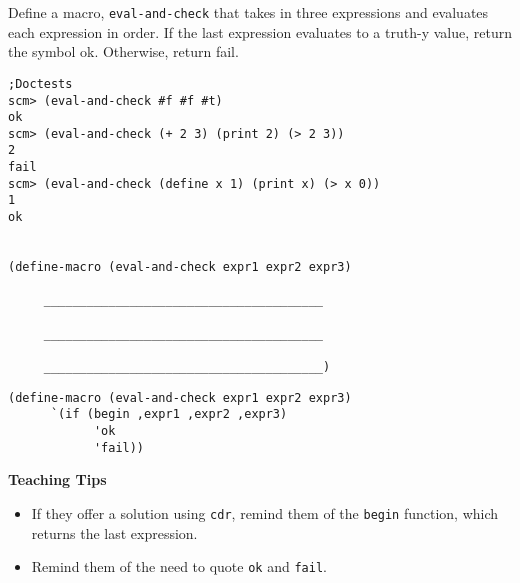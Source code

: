 \begin{blocksection}

\question Define a macro, \texttt{eval-and-check} that takes in three expressions and evaluates each expression in order. 
If the last expression evaluates to a truth-y value, return the symbol ok. Otherwise, return fail.

\begin{lstlisting}
;Doctests
scm> (eval-and-check #f #f #t)
ok
scm> (eval-and-check (+ 2 3) (print 2) (> 2 3))
2
fail
scm> (eval-and-check (define x 1) (print x) (> x 0))
1
ok


(define-macro (eval-and-check expr1 expr2 expr3)
     
     _______________________________________

     _______________________________________

     _______________________________________)
\end{lstlisting}
\end{blocksection}
\begin{blocksection}
\begin{solution}[.25in]
\begin{lstlisting}
(define-macro (eval-and-check expr1 expr2 expr3)
      `(if (begin ,expr1 ,expr2 ,expr3)
            'ok
            'fail))
\end{lstlisting}
\end{solution}

\end{blocksection}

\begin{blocksection}
\begin{guide}
\textbf{Teaching Tips}
\begin{itemize}
	\item If they offer a solution using \lstinline{cdr}, remind them of the \lstinline{begin} function, which returns the last expression.
	\item Remind them of the need to quote \lstinline{ok} and \lstinline{fail}.
\end{itemize}
\end{guide}
\end{blocksection}

